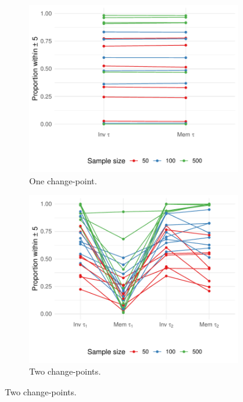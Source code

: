 \begin{figure}[ht]
    \centering
     \begin{subfigure}[b]{0.45\textwidth}
         \centering
         \includegraphics[width=\textwidth]{weib1_plplot.pdf}
         \caption{One change-point.}
         \label{fig:weib1plplot}
     \end{subfigure}
     \hfill
    \begin{subfigure}[b]{0.45\textwidth}
         \centering
         \includegraphics[width=\textwidth]{weib2_plplot.pdf}
         \caption{Two change-points.}
         \label{fig:weib2plplot}
     \end{subfigure}

\end{figure}
